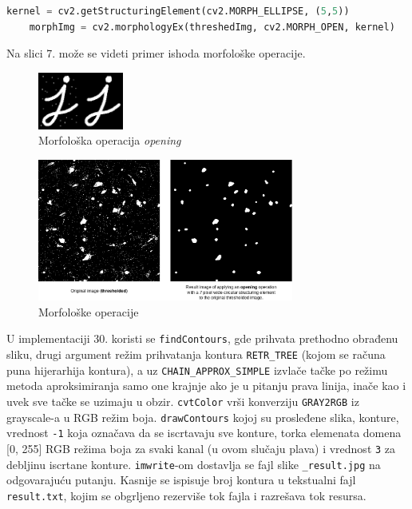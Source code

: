 \documentclass[fontsize=12bp, paper=a4]{scrarticle}
\begin{document}
\begin{lstlisting}[language=Python, caption={morfologičke operacije}]     
    kernel = cv2.getStructuringElement(cv2.MORPH_ELLIPSE, (5,5))
    morphImg = cv2.morphologyEx(threshedImg, cv2.MORPH_OPEN, kernel)
\end{lstlisting}

Na slici 7. može se videti primer ishoda morfološke operacije.

\begin{figure}[h!]
    \centering
    \includegraphics[width=0.25\textwidth]{6.png}
    \caption{\centering Morfološka operacija \textit{opening}}
\end{figure} 


\begin{figure}[h!]
    \centering
    \includegraphics[width=0.75\textwidth]{7.png}
    \caption{\centering Morfološke operacije}
\end{figure} 

U implementaciji 30. koristi se \verb|findContours|, gde prihvata prethodno obrađenu sliku, drugi argument režim prihvatanja kontura \texttt{RETR\_TREE} (kojom se računa puna hijerarhija kontura), a uz \verb|CHAIN_APPROX_SIMPLE| izvlače tačke po režimu metoda aproksimiranja samo one krajnje ako je u pitanju prava linija, inače kao i uvek sve tačke se uzimaju u obzir.
\verb|cvtColor| vrši konverziju \texttt{GRAY2RGB} iz grayscale-a u RGB režim boja.
\verb|drawContours| kojoj su prosleđene slika, konture, vrednost \verb|-1| koja označava da se iscrtavaju sve konture, torka elemenata domena [0, 255] RGB režima boja za svaki kanal (u ovom slučaju plava) i vrednost \verb|3| za debljinu iscrtane konture.
\verb|imwrite|-om dostavlja se fajl slike \verb|_result.jpg| na odgovarajuću putanju.
Kasnije se ispisuje broj kontura u tekstualni fajl \verb|result.txt|, kojim se obgrljeno rezerviše tok fajla i razrešava tok resursa.
\end{document}
